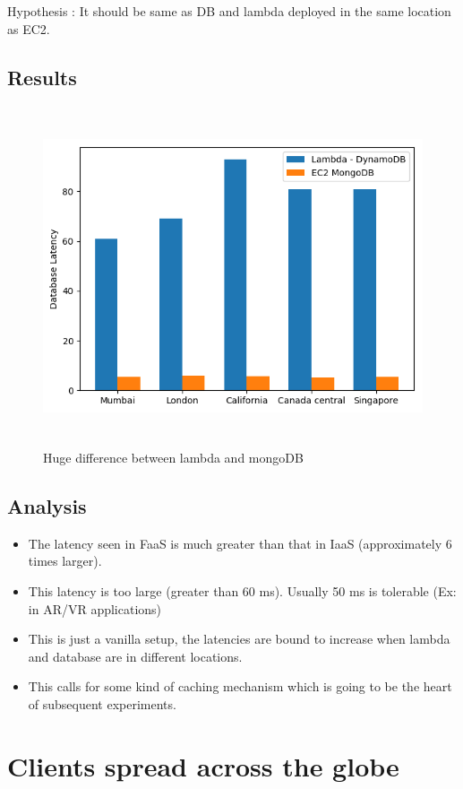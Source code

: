Hypothesis : It should be same as DB and lambda deployed in the same location as EC2.

\subsection{Results}

\begin{figure}[ht]
\centering
\includegraphics[height=10cm]{Images/1.png}
\caption{Huge difference between lambda and mongoDB}
\end{figure}

\subsection{Analysis}

\begin{itemize}
    \item The latency seen in FaaS is much greater than that in IaaS (approximately 6 times larger).
    \item This latency is too large (greater than 60 ms). Usually 50 ms is tolerable (Ex: in AR/VR applications)
    \item This is just a vanilla setup, the latencies are bound to increase when lambda and database are in different locations.
    \item This calls for some kind of caching mechanism which is going to be the heart of subsequent experiments.
\end{itemize}

\section{Clients spread across the globe}

